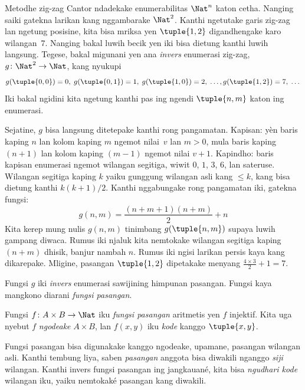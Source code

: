 \documentclass[../../../include/open-logic-section]{subfiles}
\begin{document}

\begin{explain}
Metodhe zig-zag Cantor ndadekake enumerabilitas $\Nat^n$ katon cetha.
Nanging saiki gatekna larikan kang nggambarake $\Nat^2$. Kanthi ngetutake
garis zig-zag lan ngetung posisine, kita bisa mriksa
yen $\tuple{1,2}$ digandhengake karo wilangan~$7$. Nanging bakal
luwih becik yen iki bisa dietung kanthi luwih langsung. Tegese, bakal
migunani yen ana \emph{invers} enumerasi zig-zag,
$g\colon \Nat^2 \to \Nat$, kang nyukupi
\[
g(\tuple{0,0}) = 0, \;
g(\tuple{0,1}) = 1, \;
g(\tuple{1,0}) = 2, \; \dots,
g(\tuple{1,2}) = 7, \; \dots
\]
Iki bakal ngidini kita ngetung kanthi pas ing ngendi $\tuple{n, m}$ katon
ing enumerasi.

Sejatine, $g$ bisa langsung ditetepake kanthi rong pangamatan. Kapisan:
yèn baris kaping $n$ lan kolom kaping $m$ ngemot nilai~$v$ lan $m>0$,
mula baris kaping $(n+1)$ lan kolom kaping $(m-1)$ ngemot nilai $v + 1$.
Kapindho: baris kapisan enumerasi ngemot wilangan segitiga,
wiwit $0$, $1$, $3$, $6$, lan sateruse. Wilangan segitiga kaping $k$
yaiku gunggung wilangan asli kang $\leq k$, kang bisa dietung kanthi
$k(k+1)/2$. Kanthi nggabungake rong pangamatan iki, gatekna
fungsi:
\[
  g(n,m) = \frac{(n+m+1)(n+m)}{2} + n
\]
Kita kerep mung nulis $g(n, m)$ tinimbang $g(\tuple{n, m})$ supaya
luwih gampang diwaca. Rumus iki njaluk kita nemtokake wilangan segitiga
kaping $(n+m)$ dhisik, banjur nambah $n$.
Rumus iki ngisi larikan persis kaya kang dikarepake. Mligine,
pasangan $\tuple{1, 2}$ dipetakake menyang $\frac{4 \times 3}{2} +
1 = 7$.

Fungsi $g$ iki \emph{invers} enumerasi sawijining himpunan pasangan.
Fungsi kaya mangkono diarani \emph{fungsi pasangan}.
\end{explain}

\begin{defn}
  Fungsi $f\colon A \times B \to \Nat$ iku \emph{fungsi pasangan}
  aritmetis yen $f$ injektif. Kita uga nyebut $f$
  \emph{ngodeake} $A \times B$, lan $f(x,y)$ iku
  \emph{kode} kanggo $\tuple{x,y}$.
\end{defn}

\begin{explain}
Fungsi pasangan bisa digunakake kanggo ngodeake, upamane, pasangan wilangan
asli. Kanthi tembung liya, saben \emph{pasangan} anggota bisa diwakili
nganggo \emph{siji} wilangan. Kanthi invers fungsi pasangan ing
jangkauané, kita bisa \emph{ngudhari kode} wilangan iku, yaiku
nemtokaké pasangan kang diwakili.
\end{explain}
\end{document}
